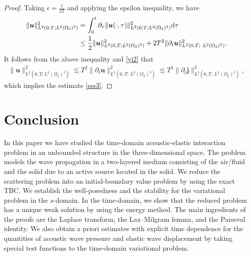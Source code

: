 \documentclass[final,leqno]{siamltex}
\begin{document}
\begin{proof}
Taking $\epsilon =\frac{1}{2T}$ and applying the epsilon inequality, we have
\begin{align*}
 \| \boldsymbol u\|^2_{L^2 (0, T; L^2 (\Omega_2)^3)}& =\int_0^{t}
\partial_{\tau} \| \boldsymbol u (\cdot, \tau)\|^2_{L^2(0, T; L^2
(\Omega_2)^3)} {\rm d \tau}\\
& \leq \frac{1}{2} \| \boldsymbol u\|^2_{L^2 (0, T; L^2 (\Omega_2)^3)}+ 2T^2
  \|\partial_t \boldsymbol u\|^2_{L^2\left(0, T;~ L^2(\Omega_2)^3
\right)},
\end{align*}
It follows from the above inequality and \eqref{yi2} that
\begin{align*}
 \| \boldsymbol u\|^2_{L^2 (0, T; L^2 (\Omega_2)^3)}
  \lesssim T^2  \|\partial_t \boldsymbol u\|^2_{L^2\left(0, T;~
L^2(\Omega_2)^3 \right)}\lesssim T^5
\|\partial_t \boldsymbol j\|^2_{L^1(0, T; ~L^2 (\Omega_2)^3)},
\end{align*}
which implies the estimate \eqref{ess3}.
\end{proof}

\section{Conclusion}\label{cl}

In this paper we have studied the time-domain acoustic-elastic interaction
problem in an unbounded structure in the three-dimensional space. The problem
models the wave propagation in a two-layered medium consisting of the air/fluid
and the solid due to an active source located in the solid. We reduce the
scattering problem into an initial-boundary value problem by using the exact
TBC. We establish the well-posedness and the stability for the variational
problem in the $s$-domain. In the time-domain, we show that the reduced
problem has a unique weak solution by using the energy method. The main
ingredients of the proofs are the Laplace transform, the Lax--Milgram lemma,
and the Parseval identity. We also obtain a priori estimates with explicit time
dependence for the quantities of acoustic wave pressure and elastic wave
displacement by taking special test functions to the time-domain variational
problem.
\end{document}
